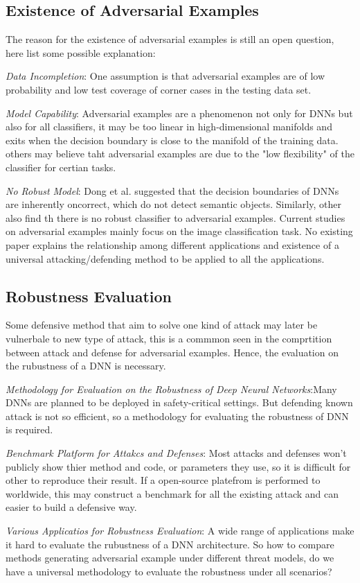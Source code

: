 \documentclass[twoside,twocolumn]{article}
\begin{document}
\subsection{Existence of Adversarial Examples}
The reason for the existence of adversarial examples is still an open question, here list some possible explanation:

\emph{Data Incompletion}: One assumption is that adversarial examples are of low probability and low test coverage of corner cases in the testing data set. 

\emph{Model Capability}: Adversarial examples are a phenomenon not only for DNNs but also for all classifiers, it may be too linear in high-dimensional manifolds and exits when the decision boundary is close to the manifold of the training data.
others may believe taht adversarial examples are due to the "low flexibility" of the classifier for certian tasks. 

\emph{No Robust Model}: Dong et al. suggested that the decision boundaries of DNNs are inherently oncorrect, which do not detect semantic objects. Similarly, other also find th there is no robust classifier to adversarial examples.
Current studies on adversarial examples mainly focus on the image classification task. No existing paper explains the
relationship among different applications and existence of a universal attacking/defending method to be applied to all the applications.

\subsection{Robustness Evaluation}
Some defensive method that aim to solve one kind of attack may later be vulnerbale to new type of attack, this is a commmon seen in the comprtition between attack and defense for adversarial examples. Hence, the evaluation on the rubustness of a DNN is necessary.

\emph{Methodology for Evaluation on the Robustness of Deep Neural Networks}:Many DNNs are planned to be deployed in
safety-critical settings. But defending known attack is not so efficient, so a methodology  for evaluating the robustness of DNN is required. 

\emph{Benchmark Platform for Attakcs and Defenses}: Most attacks and defenses won't publicly show thier method and code, or parameters they use, so it is difficult for other to reproduce their result. If a open-source platefrom is performed to worldwide, this may construct a benchmark for all the existing attack and can easier to build a defensive way.

\emph{Various Applicatios for Robustness Evaluation}: A wide range of applications make it hard to evaluate the rubustness of a DNN architecture. So how to compare methods generating adversarial example under different threat models, do we have a universal methodology to evaluate the robustness under all scenarios? 


\end{document}
